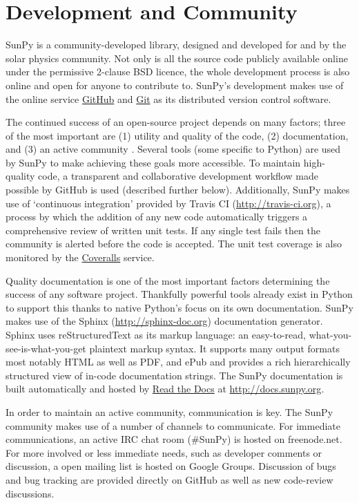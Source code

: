 \section{Development and Community}\label{sec:dev}
SunPy is a community-developed library, designed and developed for and by 
the solar physics community. Not only is all the source code publicly available 
online under the permissive 2-clause BSD licence, the whole 
development process is also online and open for anyone to contribute to.
SunPy's development makes use of the online service 
\href{http://github.com}{GitHub} and \href{http://git-scm.com/}{Git}
as its distributed version control software. 

The continued success of an open-source project depends on many factors;
three of the most important are (1) utility and quality of the code, (2) documentation, and (3) an
active community \citep{bangerth2013}. Several tools (some specific to Python) are used by
SunPy to make achieving these goals more accessible. To maintain high-quality code, a 
transparent and collaborative development workflow made possible by GitHub is used (described
further below).
Additionally, SunPy makes use of `continuous integration' provided by
Travis CI (\url{http://travis-ci.org}), a process by which the addition of any new code 
automatically triggers a comprehensive review of written unit tests. If any single test
fails then the community is alerted before the code is accepted. The unit test coverage is
also monitored by the \href{http://coveralls.io}{Coveralls} service.

Quality documentation is
one of the most important factors determining the success of any software project. 
Thankfully powerful tools already exist in Python to support this thanks to native
Python's focus on its own documentation. SunPy makes use of the Sphinx (\url{http://sphinx-doc.org})
documentation generator. Sphinx uses reStructuredText as its markup language: 
an easy-to-read, what-you-see-is-what-you-get plaintext markup syntax. It supports
many output formats most notably HTML as well as PDF, and ePub and provides a rich
hierarchically structured view of in-code documentation strings. The SunPy documentation 
is built automatically and hosted by \href{http://readthedocs.org}{Read the 
Docs} at \url{http://docs.sunpy.org}. 

In order to maintain an active community, communication is key.  The SunPy community makes
use of a number of channels to communicate. For immediate communications, an active IRC chat
room (\#SunPy) is hosted on freenode.net. For more involved or less immediate needs, such as
developer comments or discussion, a open mailing list is hosted on Google Groups. 
Discussion of bugs and bug tracking are provided directly on GitHub as well as new
code-review discussions.

